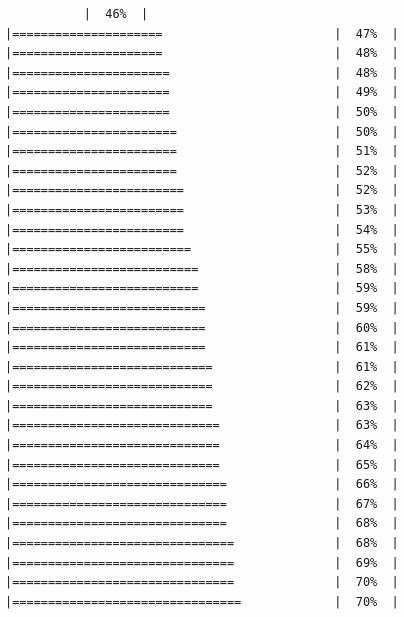 \documentclass[
  krantz2]{krantz}
\begin{document}
\begin{verbatim}
           |  46%  |                                                     |=====================                        |  47%  |                                                     |=====================                        |  48%  |                                                     |======================                       |  48%  |                                                     |======================                       |  49%  |                                                     |======================                       |  50%  |                                                     |=======================                      |  50%  |                                                     |=======================                      |  51%  |                                                     |=======================                      |  52%  |                                                     |========================                     |  52%  |                                                     |========================                     |  53%  |                                                     |========================                     |  54%  |                                                     |=========================                    |  55%  |                                                     |==========================                   |  58%  |                                                     |==========================                   |  59%  |                                                     |===========================                  |  59%  |                                                     |===========================                  |  60%  |                                                     |===========================                  |  61%  |                                                     |============================                 |  61%  |                                                     |============================                 |  62%  |                                                     |============================                 |  63%  |                                                     |=============================                |  63%  |                                                     |=============================                |  64%  |                                                     |=============================                |  65%  |                                                     |==============================               |  66%  |                                                     |==============================               |  67%  |                                                     |==============================               |  68%  |                                                     |===============================              |  68%  |                                                     |===============================              |  69%  |                                                     |===============================              |  70%  |                                                     |================================             |  70%  |                                                     
\end{verbatim}
\end{document}

